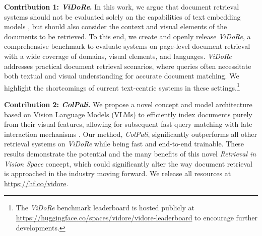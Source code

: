 \documentclass{article} %
\begin{document}
\noindent\textbf{Contribution 1: \textit{ViDoRe}.}
In this work, we argue that document retrieval systems should not be evaluated solely on the capabilities of text embedding models \citep{bajaj_ms_2016,thakur_beir_2021, muennighoff_mteb_2022}, but should also consider the context and visual elements of the documents to be retrieved. To this end, we create and openly release \textit{ViDoRe}, a comprehensive benchmark to evaluate systems on page-level document retrieval with a wide coverage of domains, visual elements, and languages. \textit{ViDoRe} addresses practical document retrieval scenarios, where queries often necessitate both textual and visual understanding for accurate document matching. We highlight the shortcomings of current text-centric systems in these settings.\footnote{The \textit{ViDoRe} benchmark leaderboard is hosted publicly at \url{https://huggingface.co/spaces/vidore/vidore-leaderboard} to encourage further developments.}


\noindent\textbf{Contribution 2: \textit{ColPali}.}
We propose a novel concept and model architecture based on Vision Language Models (VLMs) to efficiently index documents purely from their visual features, allowing for subsequent fast query matching with late interaction mechanisms \citep{khattab_colbert_2020}. Our method, \textit{ColPali}, significantly outperforms all other retrieval systems on \textit{ViDoRe} while being fast and end-to-end trainable.
These results demonstrate the potential and the many benefits of this novel \textit{Retrieval in Vision Space} concept, which could significantly alter the way document retrieval is approached in the industry moving forward.
We release all resources at \url{https://hf.co/vidore}.




\end{document}
